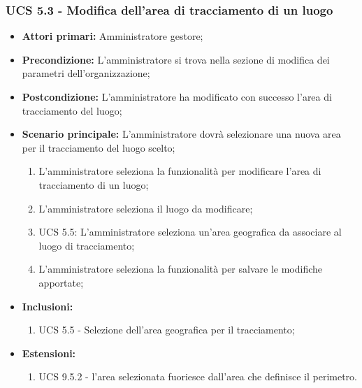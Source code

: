 \subsubsection{UCS 5.3 - Modifica dell'area di tracciamento di un luogo}%
\begin{itemize}
    \item \textbf{Attori primari:} Amministratore gestore;
    \item \textbf{Precondizione:} L'amministratore si trova nella sezione di modifica dei parametri dell'organizzazione;
    \item \textbf{Postcondizione:} L'amministratore ha modificato con successo l'area di tracciamento del luogo;
    \item \textbf{Scenario principale:} L'amministratore dovrà selezionare una nuova area per il tracciamento del luogo scelto;
    \begin{enumerate}%
        \item L'amministratore seleziona la funzionalità per modificare l'area di tracciamento di un luogo;
        \item L'amministratore seleziona il luogo da modificare;
        \item UCS 5.5: L'amministratore seleziona un'area geografica da associare al luogo di tracciamento;
        \item L'amministratore seleziona la funzionalità per salvare le modifiche apportate;
    \end{enumerate}
    \item \textbf{Inclusioni:}
    \begin{enumerate}
        \item UCS 5.5 - Selezione dell'area geografica per il tracciamento;
    \end{enumerate}
    \item \textbf{Estensioni:}
    \begin{enumerate}
        \item UCS 9.5.2 - l'area selezionata fuoriesce dall'area che definisce il perimetro.
    \end{enumerate}
\end{itemize}

